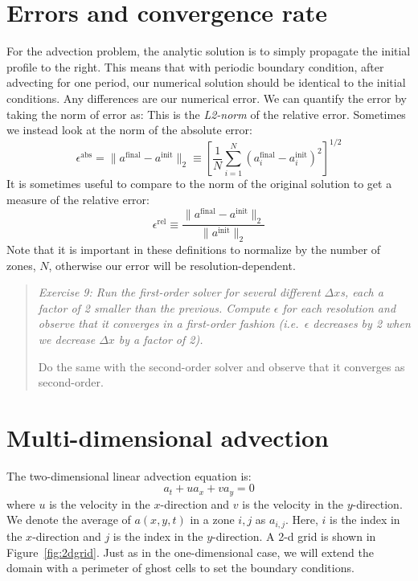\documentclass[11pt]{article}
\begin{document}
\section{Errors and convergence rate}

For the advection problem, the analytic solution is to simply propagate
the initial profile to the right.  This means that with periodic boundary
condition, after advecting for one period, our numerical solution should
be identical to the initial conditions.  Any differences are our
numerical error.  We can quantify the error by taking the norm of error as:
This is the {\em L2-norm} of the relative error.  Sometimes we instead look
at the norm of the absolute error:
\begin{equation}
\epsilon^\mathrm{abs} = \| a^\mathrm{final} - a^\mathrm{init} \|_2 \equiv
   \left [ \frac{1}{N} \sum_{i=1}^N 
   ( a_i^\mathrm{final} - a_i^\mathrm{init} )^2
  \right ]^{1/2}
\end{equation}
It is sometimes useful to compare to the norm of the original solution
to get a measure of the relative error:
\begin{equation}
\epsilon^\mathrm{rel} \equiv \frac{\| a^\mathrm{final} - a^\mathrm{init} \|_2}
   {\| a^\mathrm{init} \|_2}
\end{equation}
Note that it is important in these definitions to normalize by the number
of zones, $N$, otherwise our error will be resolution-dependent.
%
\begin{quote}
{\em Exercise 9: Run the first-order solver for several different $\Delta x$s,
each a factor of 2 smaller than the previous.  Compute $\epsilon$ for
each resolution and observe that it converges in a first-order fashion
(i.e.\ $\epsilon$ decreases by 2 when we decrease $\Delta x$ by a factor of 2).

Do the same with the second-order solver and observe that it converges
as second-order.
}
\end{quote}

\section{Multi-dimensional advection}

The two-dimensional linear advection equation is:
\begin{equation}
a_t + u a_x + v a_y = 0
\label{eq:advect2d}
\end{equation}
where $u$ is the velocity in the $x$-direction and $v$ is the velocity in
the $y$-direction.  We denote the average of $a(x,y,t)$ in a zone $i,j$ as
$a_{i,j}$.  Here, $i$ is the index in the $x$-direction and $j$ is the
index in the $y$-direction.  A 2-d grid is shown in Figure~\ref{fig:2dgrid}.
Just as in the one-dimensional case, we will extend the domain with a
perimeter of ghost cells to set the boundary conditions.
\end{document}
